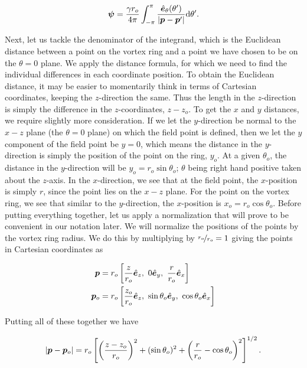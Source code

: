 \begin{equation}
    \label{eqn:psi4}
    \bm{\psi} = \frac{\gamma r_o}{4\pi} \int_{-\pi}^{\pi} \frac{ \hat{\bm{e}}_\theta(\theta')}{|\bm{p}-\bm{p}'|} \mathrm{d}\theta'.
\end{equation}

Next, let us tackle the denominator of the integrand, which is the Euclidean distance between a point on the vortex ring and a point we have chosen to be on the \(\theta=0\) plane.
%
We apply the distance formula, for which we need to find the individual differences in each coordinate position.
%
To obtain the Euclidean distance, it may be easier to momentarily think in terms of Cartesian coordinates, keeping the \(z\)-direction the same.
%
Thus the length in the \(z\)-direction is simply the difference in the \(z\)-coordinates, \(z-z_o\).
%
To get the \(x\) and \(y\) distances, we require slightly more consideration.
%
If we let the \(y\)-direction be normal to the \(x-z\) plane (the \(\theta = 0\) plane) on which the field point is defined,
then we let the \(y\) component of the field point be \(y = 0\),
which means the distance in the \(y\)-direction is simply the position of the point on the ring, \(y_o\).
%
At a given \(\theta_o\), the distance in the \(y\)-direction will be \(y_o = r_o \sin\theta_o\); \(\theta\) being right hand positive taken about the \(z\)-axis.
%
In the \(x\)-direction, we see that at the field point, the \(x\)-position is simply \(r\), since the point lies on the \(x-z\) plane.
%
For the point on the vortex ring, we see that similar to the \(y\)-direction, the \(x\)-position is \(x_o = r_o \cos\theta_o\).
%
Before putting everything together, let us apply a normalization that will prove to be convenient in our notation later.
%
We will normalize the positions of the points by the vortex ring radius.
%
We do this by multiplying by \(\nicefrac{r_o}{r_o}=1\) giving the points in Cartesian coordinates as

\begin{align}
    \bm{p} &= r_o\left[\frac{z}{r_o} \hat{\bm{e}}_z,~ 0 \hat{\bm{e}}_y,~ \frac{r}{r_o}\hat{\bm{e}}_x\right] \\
    \bm{p}_o &= r_o\left[\frac{z_o}{r_o} \hat{\bm{e}}_z,~ \sin\theta_o \hat{\bm{e}}_y,~ \cos\theta_o\hat{\bm{e}}_x\right]
\end{align}

Putting all of these together we have

\begin{equation}
    \label{eqn:euclideandistance1}
    |\bm{p}-\bm{p}_o| = r_o \left[\left(\frac{z-z_o}{r_o}\right)^2 + (\sin\theta_o)^2 + \left(\frac{r}{r_o}-\cos\theta_o\right)^2 \right]^{1/2}.
\end{equation}


